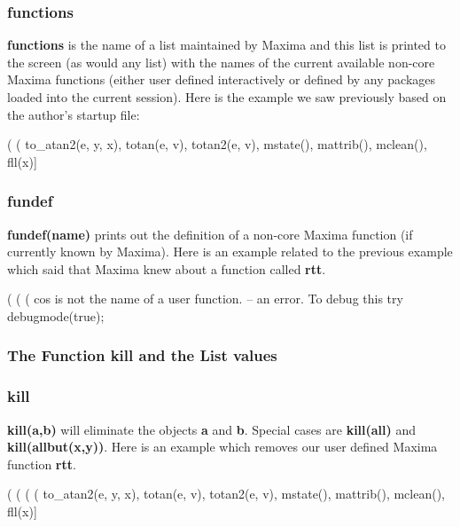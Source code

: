 \documentclass[11pt]{article}
\begin{document}
\subsubsection*{\textbf{functions}}
\textbf{functions} is the name of a list maintained by Maxima and this list
  is printed to the screen (as would any list) with the names of the current 
  available non-core Maxima functions (either user defined interactively 
  or defined by any packages loaded into the current session).
Here is the example we saw previously based on the author's startup file:
\begin{myVerbatim}
(%
(%
to_atan2(e, y, x), totan(e, v), totan2(e, v), mstate(), mattrib(), mclean(), 
fll(x)]
\end{myVerbatim}
\subsubsection*{\textbf{fundef}}
\textbf{fundef(name)} prints out the definition of a non-core Maxima function
  (if currently known by Maxima).
Here is an example related to the previous example which said that Maxima knew
  about a function called \textbf{rtt}.
\begin{myVerbatim}
(%
(%
(%
cos is not the name of a user function.
 -- an error.  To debug this try debugmode(true);
\end{myVerbatim}
\newpage
\subsubsection{The Function \textbf{kill} and the List \textbf{values}}
\subsubsection*{ \textbf{kill}}
 \textbf{kill(a,b)} will eliminate the objects \textbf{a} and \textbf{b}.
Special cases are \textbf{kill(all)} and \textbf{kill(allbut(x,y))}.
Here is an example which removes our user defined Maxima function \textbf{rtt}.
\begin{myVerbatim}
(%
(%
(%
(%
to_atan2(e, y, x), totan(e, v), totan2(e, v), mstate(), mattrib(), mclean(), 
fll(x)]
\end{myVerbatim}
\end{document}
